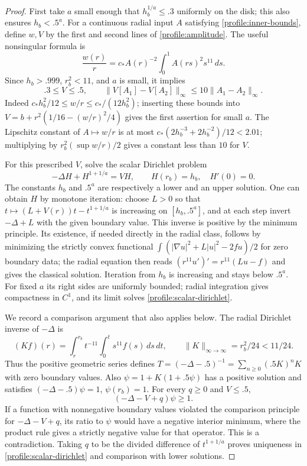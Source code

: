 \begin{proof}
First take $a$ small enough that $h_b^{1/a}\le.3$ uniformly on the disk;
this also ensures $h_b<.5^a$.  For a continuous radial input $A$ satisfying
\eqref{profile:inner-bounds}, define $w,V$ by the first and second lines
of \eqref{profile:amplitude}.  The useful nonsingular formula is
\begin{equation}\label{profile:w-ratio}
 \frac{w(r)}r=c_* A(r)^{-2}\int_0^1A(rs)^2s^{11}\,ds.
\end{equation}
Since $h_b>.999$, $r_b^2<11$, and $a$ is small, it implies
\begin{equation}\label{profile:V-bounds}
 .3\le V\le .5,\qquad
 \|V[A_1]-V[A_2]\|_\infty\le10\|A_1-A_2\|_\infty.
\end{equation}
Indeed $c_*h_b^2/12\le w/r\le c_*/(12h_b^2)$; inserting these bounds
into $V=b+r^2(1/16-(w/r)^2/4)$ gives the first assertion for small $a$.
The Lipschitz constant of $A\mapsto w/r$ is at most
$c_*(2h_b^{-3}+2h_b^{-2})/12<2.01$; multiplying by
$r_b^2(\sup w/r)/2$ gives a constant less than $10$ for $V$.

For this prescribed $V$, solve the scalar Dirichlet problem
\begin{equation}\label{profile:scalar-dirichlet}
 -\Delta H+H^{1+1/a}=VH,\qquad H(r_b)=h_b,\quad H'(0)=0.
\end{equation}
The constants $h_b$ and $.5^a$ are respectively a lower and an upper
solution.  One can obtain $H$ by monotone iteration: choose $L>0$ so that
$t\mapsto(L+V(r))t-t^{1+1/a}$ is increasing on $[h_b,.5^a]$, and at
each step invert $-\Delta+L$ with the given boundary value.  This inverse
is positive by the minimum principle.  Its existence, if needed directly
in the radial class, follows by minimizing the strictly convex functional
$\int(|\nabla u|^2+L|u|^2-2fu)/2$ for zero boundary data; the radial
equation then reads $(r^{11}u')'=r^{11}(Lu-f)$ and gives the classical
solution.  Iteration from $h_b$ is increasing and stays below $.5^a$.
For fixed $a$ its right sides are uniformly bounded; radial integration
gives compactness in $C^1$, and its limit solves
\eqref{profile:scalar-dirichlet}.

We record a comparison argument that also applies below.  The radial
Dirichlet inverse of $-\Delta$ is
\[
 (Kf)(r)=\int_r^{r_b}t^{-11}\int_0^t s^{11}f(s)\,ds\,dt,
       \qquad \|K\|_{\infty\to\infty}=r_b^2/24<11/24.
\]
Thus the positive geometric series defines
$T=(-\Delta-.5)^{-1}=\sum_{n\ge0}(.5K)^nK$ with zero boundary values.
Also $\psi=1+K(1+.5\psi)$ has a positive solution and satisfies
$(-\Delta-.5)\psi=1$, $\psi(r_b)=1$.  For every $q\ge0$ and $V\le.5$,
\[
 (-\Delta-V+q)\psi\ge1.
\]
If a function with nonnegative boundary values violated the comparison
principle for $-\Delta-V+q$, its ratio to $\psi$ would have a negative
interior minimum, where the product rule gives a strictly negative value
for that operator.  This is a contradiction.  Taking $q$ to be the
divided difference of $t^{1+1/a}$ proves uniqueness in
\eqref{profile:scalar-dirichlet} and comparison with lower solutions.


\end{proof}
